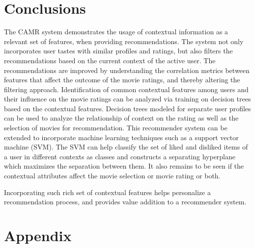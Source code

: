\documentclass{article}
\begin{document}
\section{Conclusions}
The CAMR system demonstrates the usage of contextual information as a relevant set of features, when providing recommendations. The system not only incorporates user tastes with similar profiles and ratings, but also filters the recommendations based on the current context of the active user. The recommendations are improved by understanding the correlation metrics between features that affect the outcome of the movie ratings, and thereby altering the filtering approach. Identification of common contextual features among users and their influence on the movie ratings can be analyzed via training on decision trees based on the contextual features. Decision trees modeled for separate user profiles can be used to analyze the relationship of context on the rating as well as the selection of movies for recommendation. This recommender system can be extended to incorporate machine learning techniques such as a support vector machine (SVM). The SVM can help classify the set of liked and disliked items of a user in different contexts as classes and constructs a separating hyperplane which maximizes the separation between them. It also remains to be seen if the contextual attributes affect the movie selection or movie rating or both.


Incorporating such rich set of contextual features helps personalize a recommendation process, and provides value addition to a recommender system.

\section{Appendix}
\end{document}
